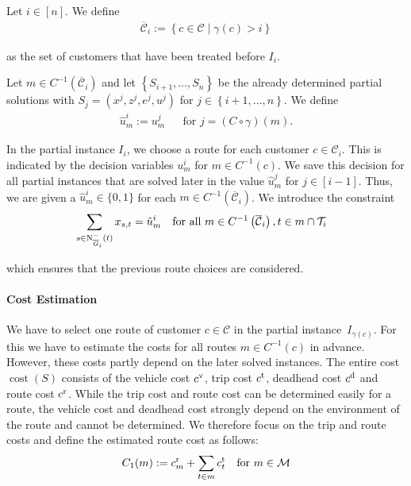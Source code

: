 \begin{definition}
\label{def:route_fix}

Let ${i\in[n]}$. We define 
\begin{align*}
	\overline{\mathcal{C}}_i := \left\{c\in\mathcal{C}\mid \gamma\left(c\right)>i\right\}
\end{align*}

as the set of customers that have been treated before $I_i$.

Let ${m\in C^{-1}\left(\overline{\mathcal{C}}_i\right)}$ and let $\left\{S_{i+1},\dots,S_n\right\}$ be the already determined partial solutions with ${S_j=\left(x^j,z^j,e^j,u^j\right)}$ for ${j\in\left\{i+1,\dots,n\right\}}$. We define
\begin{align*}
	\hat{u}^i_m := u^j_m && \text{for } j=\left(C\circ\gamma\right)(m).
\end{align*}

\end{definition}

In the partial instance $I_i$, we choose a route for each customer $c\in\mathcal{C}_i$. This is indicated by the decision variables $u^i_m$ for ${m\in C^{-1}(c)}$. We save this decision for all partial instances that are solved later in the value $\hat{u}^j_m$ for ${j\in[i-1]}$. Thus, we are given a ${\hat{u}^i_m\in\{0,1\}}$ for each ${m\in C^{-1}\left(\overline{\mathcal{C}}_i\right)}$. We introduce the constraint
\begin{align}
	&\sum_{s\in\operatorname{N}_{\overline{G}_i}^-(t)} x_{s,t} = \hat{u}^i_m && \text{for all } m\in C^{-1}\left(\overline{\mathcal{C}}_i\right), t\in m\cap\mathcal{T}_i \label{eq:TMILP:route_fix}
\end{align}

which ensures that the previous route choices are considered.

\paragraph{Cost Estimation} \parfill

We have to select one route of customer ${c\in\mathcal{C}}$ in the partial instance~$I_{\gamma(c)}$. For this we have to estimate the costs for all routes $m\in C^{-1}(c)$ in advance. However, these costs partly depend on the later solved instances. The entire cost $\operatorname{cost}(S)$ consists of the vehicle cost $c^{\operatorname{v}}$, trip cost $c^{\operatorname{t}}$, deadhead cost $c^{\operatorname{d}}$ and route cost $c^{\operatorname{r}}$. While the trip cost and route cost can be determined easily for a route, the vehicle cost and deadhead cost strongly depend on the environment of the route and cannot be determined. We therefore focus on the trip and route costs and define the estimated route cost as follows: 
\begin{align*}
	C_1(m) := c^{\operatorname{r}}_m + \sum_{t\in m}c^{\operatorname{t}}_t && \text{for } m\in\mathcal{M}
\end{align*}

